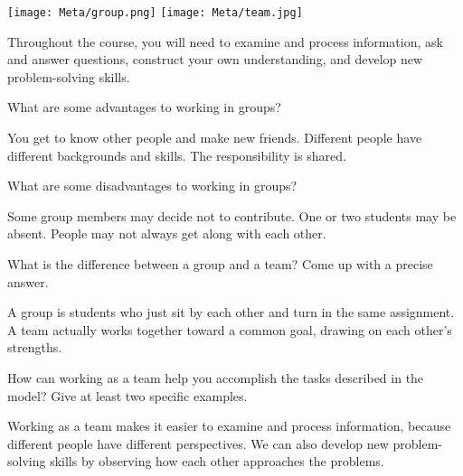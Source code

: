 

\begin{center}
\texttt{[image: Meta/group.png]}
\hspace{0.5in}
\texttt{[image: Meta/team.jpg]}
\end{center}

Throughout the course, you will need to examine and process information, ask and answer questions, construct your own understanding, and develop new problem-solving skills.



\Q What are some advantages to working in groups?

\begin{answer}[5em]
You get to know other people and make new friends.
Different people have different backgrounds and skills.
The responsibility is shared.
\end{answer}


\Q What are some disadvantages to working in groups?

\begin{answer}[5em]
Some group members may decide not to contribute.
One or two students may be absent.
People may not always get along with each other.
\end{answer}


\Q What is the difference between a group and a team? Come up with a precise answer.

\begin{answer}[5em]
A group is students who just sit by each other and turn in the same assignment.
A team actually works together toward a common goal, drawing on each other's strengths.
\end{answer}


\Q How can working as a team help you accomplish the tasks described in the model?
Give at least two specific examples.

\begin{answer}[5em]
Working as a team makes it easier to examine and process information, because different people have different perspectives.
We can also develop new problem-solving skills by observing how each other approaches the problems.
\end{answer}
